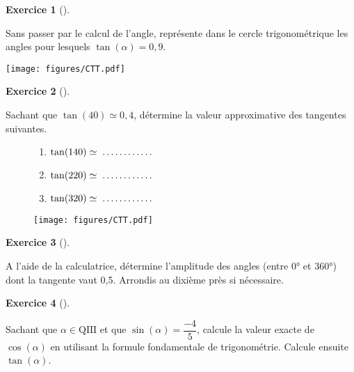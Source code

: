 \documentclass[
  a4paper,
  DIV=11,
  numbers=noendperiod,
  oneside]{scrreprt}
\theoremstyle{definition}
\theoremstyle{definition}
\newtheorem{exercise}{Exercice}[chapter]
\theoremstyle{plain}
\theoremstyle{definition}
\theoremstyle{remark}
\begin{document}
\begin{exercise}[]\protect\hypertarget{exr-}{}\label{exr-}

Sans passer par le calcul de l'angle, représente dans le cercle
trigonométrique les angles pour lesquels \(\tan(\alpha) = 0,9\).

\begin{center}
\texttt{[image: figures/CTT.pdf]}
\end{center}

\end{exercise}

\begin{exercise}[]\protect\hypertarget{exr-}{}\label{exr-}

Sachant que \(\tan(40) \simeq 0,4\), détermine la valeur approximative
des tangentes suivantes.

\begin{figure}

\begin{minipage}{0.60\linewidth}

\begin{enumerate}
\def\labelenumi{\arabic{enumi})}
\item
  \(\tan(140)\simeq\makebox[2cm]{\dotfill}\)
\item
  \(\tan(220)\simeq\makebox[2cm]{\dotfill}\)
\item
  \(\tan(320)\simeq\makebox[2cm]{\dotfill}\)
\end{enumerate}

\end{minipage}%
%
\begin{minipage}{0.40\linewidth}
\begin{center}
\texttt{[image: figures/CTT.pdf]}
\end{center}
\end{minipage}%

\end{figure}%

\end{exercise}

\begin{exercise}[]\protect\hypertarget{exr-}{}\label{exr-}

A l'aide de la calculatrice, détermine l'amplitude des angles (entre 0°
et 360°) dont la tangente vaut 0,5. Arrondis au dixième près si
nécessaire.

\end{exercise}

\begin{exercise}[]\protect\hypertarget{exr-}{}\label{exr-}

Sachant que \(\alpha\in\text{QIII}\) et que
\(\sin(\alpha) = \dfrac{-4}{5}\), calcule la valeur exacte de
\(\cos(\alpha)\) en utilisant la formule fondamentale de trigonométrie.
Calcule ensuite \(\tan(\alpha)\).

\end{exercise}
\end{document}
